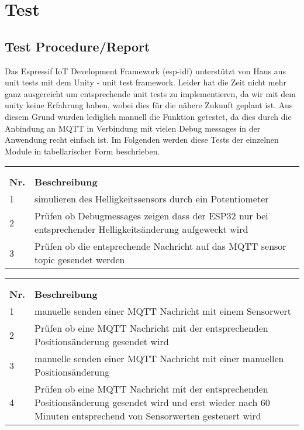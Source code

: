 \chapter{Test}
\label{cha:Test}

\section{Test Procedure/Report}
Das Espressif IoT Development Framework (esp-idf) unterstützt von Haus aus unit tests mit dem Unity - unit test framework. Leider hat die Zeit nicht mehr ganz ausgereicht um entsprechende unit tests zu implementieren, da wir mit dem unity keine Erfahrung haben, wobei dies für die nähere Zukunft geplant ist. Aus diesem Grund wurden lediglich manuell die Funktion getestet, da dies durch die Anbindung an MQTT in Verbindung mit vielen Debug messages in der Anwendung recht einfach ist. Im Folgenden werden diese Tests der einzelnen Module in tabellarischer Form beschrieben.


\begin{longtable}[ht]{p{}  p{}}
	\captionabove[Test Sensor Module]{Test Sensor Module}\\
	\label{tab:sensortest}\\
	\toprule
	\rowcolor[HTML]{FFFC9E} 
	{\color[HTML]{333333} \textbf{Nr.}} & {\color[HTML]{333333} \textbf{Beschreibung}} \\* \midrule
	\endhead
	1 & simulieren des Helligkeitssensors durch ein Potentiometer\\* \midrule
	2 & Prüfen ob Debugmessages zeigen dass der ESP32 nur bei entsprechender Helligkeitsänderung aufgeweckt wird\\* \midrule
	3 & Prüfen ob die entsprechende Nachricht auf das MQTT sensor topic gesendet werden \\*
	\bottomrule
\end{longtable}

\begin{longtable}[ht]{p{}  p{}}
	\captionabove[Regler Module]{Regler Module}\\
	\label{tab:reglertest}\\
	\toprule
	\rowcolor[HTML]{FFFC9E} 
	{\color[HTML]{333333} \textbf{Nr.}} & {\color[HTML]{333333} \textbf{Beschreibung}} \\* \midrule
	\endhead
	1 & manuelle senden einer MQTT Nachricht mit einem Sensorwert\\* \midrule
	2 & Prüfen ob eine MQTT Nachricht mit der entsprechenden Positionsänderung gesendet wird\\* \midrule
	3 & manuelle senden einer MQTT Nachricht mit einer manuellen Positionsänderung\\* \midrule
	4 & Prüfen ob eine MQTT Nachricht mit der entsprechenden Positionsänderung gesendet wird und erst wieder nach 60 Minuten entsprechend von Sensorwerten gesteuert wird\\*
	\bottomrule
\end{longtable}

